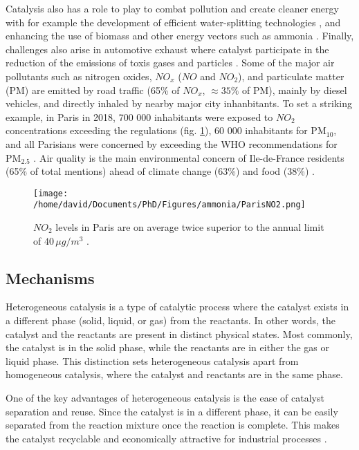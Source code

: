 Catalysis also has a role to play to combat pollution and create cleaner energy with for example the development of efficient water-splitting technologies \parencite{AHMAD2015599}, and enhancing the use of biomass and other energy vectors such as ammonia \parencite{Fang2022}.
Finally, challenges also arise in automotive exhaust where catalyst participate in the reduction of the emissions of toxis gases and particles \parencite{WHOAirPollution, GANDHI2003433}.
Some of the major air pollutants such as nitrogen oxides, $NO_x$ ($NO$ and $NO_2$), and particulate matter (PM) are emitted by road traffic (65\% of $NO_x$, $\approx 35\%$ of PM), mainly by diesel vehicles, and directly inhaled by nearby major city inhanbitants.
To set a striking example, in Paris in 2018, 700 000 inhabitants were exposed to $NO_2$ concentrations exceeding the regulations (fig. \ref{fig:NO2Paris}), 60 000 inhabitants for PM$_{10}$, and all Parisians were concerned by exceeding the WHO recommendations for PM$_{2.5}$ \parencite{AirParis}.
Air quality is the main environmental concern of Ile-de-France residents (65\% of total mentions) ahead of climate change (63\%) and food (38\%) \parencite{AirParis}.

\begin{figure}[!htb]
    \centering
    \texttt{[image: /home/david/Documents/PhD/Figures/ammonia/ParisNO2.png]}
    \caption{
        $NO_2$ levels in Paris are on average twice superior to the annual limit of $40 \, \mu g / m^3$ \parencite{AirParis}.
    }
    \label{fig:NO2Paris}
\end{figure}

\subsection{Mechanisms}

Heterogeneous catalysis is a type of catalytic process where the catalyst exists in a different phase (solid, liquid, or gas) from the reactants.
In other words, the catalyst and the reactants are present in distinct physical states.
Most commonly, the catalyst is in the solid phase, while the reactants are in either the gas or liquid phase.
This distinction sets heterogeneous catalysis apart from homogeneous catalysis, where the catalyst and reactants are in the same phase.

One of the key advantages of heterogeneous catalysis is the ease of catalyst separation and reuse.
Since the catalyst is in a different phase, it can be easily separated from the reaction mixture once the reaction is complete.
This makes the catalyst recyclable and economically attractive for industrial processes \parencite{FECHETE20122}.


